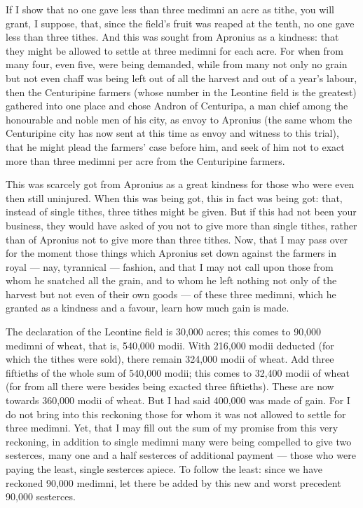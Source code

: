  If I show that no one gave less than three medimni an acre as tithe, you will grant, I suppose, that, since the field's fruit was reaped at the tenth, no one gave less than three tithes. And this was sought from Apronius as a kindness: that they might be allowed to settle at three medimni for each acre. For when from many four, even five, were being demanded, while from many not only no grain but not even chaff was being left out of all the harvest and out of a year's labour, then the Centuripine farmers (whose number in the Leontine field is the greatest) gathered into one place and chose Andron of Centuripa, a man chief among the honourable and noble men of his city, as envoy to Apronius (the same whom the Centuripine city has now sent at this time as envoy and witness to this trial), that he might plead the farmers' case before him, and seek of him not to exact more than three medimni per acre from the Centuripine farmers.

 This was scarcely got from Apronius as a great kindness for those who were even then still uninjured. When this was being got, this in fact was being got: that, instead of single tithes, three tithes might be given. But if this had not been your business, they would have asked of you not to give more than single tithes, rather than of Apronius not to give more than three tithes. Now, that I may pass over for the moment those things which Apronius set down against the farmers in royal --- nay, tyrannical --- fashion, and that I may not call upon those from whom he snatched all the grain, and to whom he left nothing not only of the harvest but not even of their own goods --- of these three medimni, which he granted as a kindness and a favour, learn how much gain is made.

 The declaration of the Leontine field is 30,000 acres; this comes to 90,000 medimni of wheat, that is, 540,000 modii. With 216,000 modii deducted (for which the tithes were sold), there remain 324,000 modii of wheat. Add three fiftieths of the whole sum of 540,000 modii; this comes to 32,400 modii of wheat (for from all there were besides being exacted three fiftieths). These are now towards 360,000 modii of wheat. But I had said 400,000 was made of gain. For I do not bring into this reckoning those for whom it was not allowed to settle for three medimni. Yet, that I may fill out the sum of my promise from this very reckoning, in addition to single medimni many were being compelled to give two sesterces, many one and a half sesterces of additional payment --- those who were paying the least, single sesterces apiece. To follow the least: since we have reckoned 90,000 medimni, let there be added by this new and worst precedent 90,000 sesterces.

